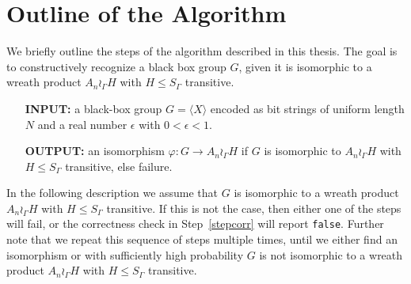 \section{Outline of the Algorithm}
We briefly outline the steps of the algorithm described in this thesis.
The goal is to constructively recognize a black box group $G$, given it is isomorphic to a wreath product $A_n \wr_\Gamma H$ with $H\leq S_\Gamma$ transitive.
 
 
 \begin{itemize}[leftmargin=3.0cm,labelsep=0.5cm]
\item[\textbf{INPUT:}] a black-box group $G = \langle X \rangle$ encoded as bit strings of uniform
length $N$ and a real number $\epsilon$ with $0 < \epsilon < 1$.
\item[\textbf{OUTPUT:}] an isomorphism $\varphi \colon G\to A_n\wr_\Gamma H$ if $G$ is isomorphic to \mbox{$A_n\wr_\Gamma H$}
with $H\leq S_\Gamma$ transitive, else failure.
\end{itemize}
In the following description we assume that $G$ is isomorphic to a wreath product $A_n \wr_\Gamma H$ with $H\leq S_\Gamma$ transitive.
If this is not the case, then either one of the steps will fail, or the correctness check in Step~\ref{stepcorr} will report \texttt{false}.
Further note that we repeat this sequence of steps multiple times, until we either find an isomorphism or with sufficiently high probability $G$ is not
isomorphic to a wreath product $A_n \wr_\Gamma H$ with $H\leq S_\Gamma$ transitive.
